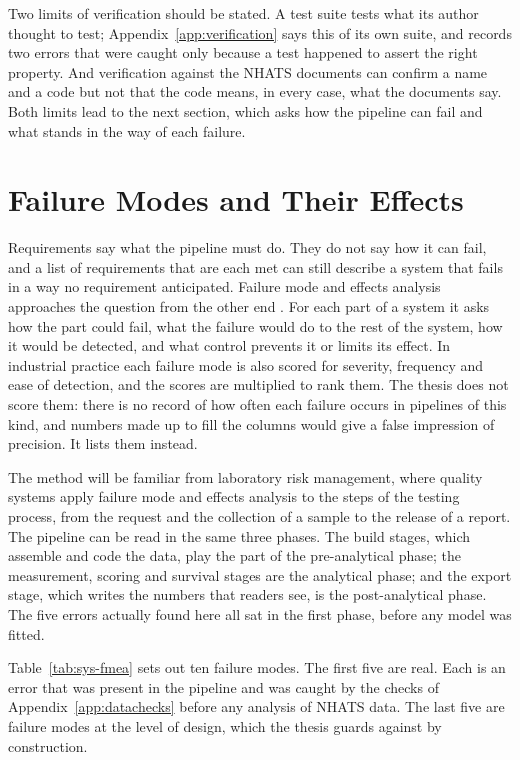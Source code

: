 Two limits of verification should be stated. A test suite tests what its
author thought to test; Appendix~\ref{app:verification} says this of its own
suite, and records two errors that were caught only because a test happened
to assert the right property. And verification against the NHATS documents
can confirm a name and a code but not that the code means, in every case,
what the documents say. Both limits lead to the next section, which asks how
the pipeline can fail and what stands in the way of each failure.

\section{Failure Modes and Their Effects}
\label{sec:sys-fmea}

Requirements say what the pipeline must do. They do not say how it can fail,
and a list of requirements that are each met can still describe a system that
fails in a way no requirement anticipated. Failure mode and effects analysis
approaches the question from the other end \citep{stamatis_2003}. For each
part of a system it asks how the part could fail, what the failure would do
to the rest of the system, how it would be detected, and what control
prevents it or limits its effect. In industrial practice each failure mode is
also scored for severity, frequency and ease of detection, and the scores are
multiplied to rank them. The thesis does not score them: there is no record of
how often each failure occurs in pipelines of this kind, and numbers made up to
fill the columns would give a false impression of precision. It lists them
instead.

The method will be familiar from laboratory risk management, where quality
systems apply failure mode and effects analysis to the steps of the testing
process, from the request and the collection of a sample to the release of a
report. The pipeline can be read in the same three phases. The build stages,
which assemble and code the data, play the part of the pre-analytical phase;
the measurement, scoring and survival stages are the analytical phase; and the
export stage, which writes the numbers that readers see, is the
post-analytical phase. The five errors actually found here all sat in the
first phase, before any model was fitted.

Table~\ref{tab:sys-fmea} sets out ten failure modes. The first five are real.
Each is an error that was present in the pipeline and was caught by the checks
of Appendix~\ref{app:datachecks} before any analysis of NHATS data. The last
five are failure modes at the level of design, which the thesis guards
against by construction.

